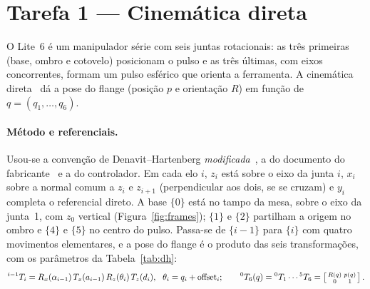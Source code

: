 \section{Tarefa 1 --- Cinemática direta}

O Lite~6 é um manipulador série com seis juntas rotacionais: as três
primeiras (base, ombro e cotovelo) posicionam o pulso e as três últimas, com
eixos concorrentes, formam um pulso esférico que orienta a ferramenta. A
cinemática direta~\cite{sequeira2024,siciliano2009} dá a pose do flange
(posição $p$ e orientação $R$) em função de $q = (q_1,\dots,q_6)$.

\paragraph{Método e referenciais.} Usou-se a convenção de Denavit--Hartenberg
\emph{modificada}~\cite{craig2005}, a do documento do
fabricante~\cite{ufactory_dh} e a do controlador. Em cada elo $i$, $z_i$ está
sobre o eixo da junta $i$, $x_i$ sobre a normal comum a $z_i$ e $z_{i+1}$
(perpendicular aos dois, se se cruzam) e $y_i$ completa o referencial direto.
A base $\{0\}$ está no tampo da mesa, sobre o eixo da junta~1, com $z_0$
vertical (Figura~\ref{fig:frames}); $\{1\}$ e $\{2\}$ partilham a origem no
ombro e $\{4\}$ e $\{5\}$ no centro do pulso. Passa-se de $\{i-1\}$ para
$\{i\}$ com quatro movimentos elementares, e a pose do flange é o produto das
seis transformações, com os parâmetros da Tabela~\ref{tab:dh}:
\begin{equation}
{}^{i-1}T_{i} = R_x(\alpha_{i-1})\,T_x(a_{i-1})\,R_z(\theta_i)\,T_z(d_i),
\ \ \theta_i = q_i + \text{offset}_i;
\qquad
{}^{0}T_{6}(q) = {}^{0}T_{1}\cdots{}^{5}T_{6}
= \left[\begin{smallmatrix} R(q) & p(q)\\ 0 & 1\end{smallmatrix}\right].
\label{eq:fk}
\end{equation}

